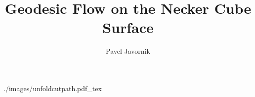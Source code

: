 \documentclass []{article}
\title {Geodesic Flow on the Necker Cube Surface}
\date {}
\author {Pavel Javornik}
\newtheorem *{thm*}{Theorem}
\begin{document}
\pagestyle {empty}\begin {center}\def \svgwidth {0.99\textwidth } {./images/}{unfoldcutpath.pdf_tex}\end {center}
\end{document}

